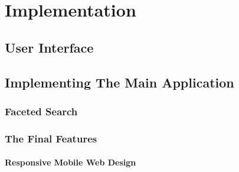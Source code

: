 \chapter{Implementation}



\section{User Interface}
\label{impl-ui}

\section{Implementing The Main Application}

\subsection{Faceted Search}
\label{impl-facetview}

\subsection{The Final Features}

\subsubsection{Responsive Mobile Web Design}
\label{impl-mobile}


